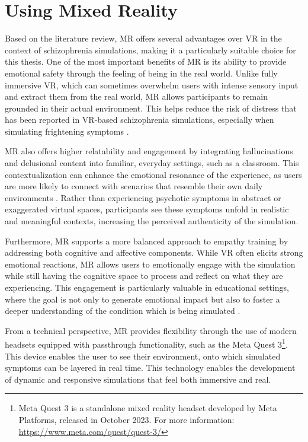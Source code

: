 \section{Using Mixed Reality}

Based on the literature review, MR offers several advantages over VR in the context of schizophrenia simulations, making it a particularly suitable choice for this thesis. One of the most important benefits of MR is its ability to provide emotional safety through the feeling of being in the real world. Unlike fully immersive VR, which can sometimes overwhelm users with intense sensory input and extract them from the real world, MR allows participants to remain grounded in their actual environment. This helps reduce the risk of distress that has been reported in VR-based schizophrenia simulations, especially when simulating frightening symptoms \cite{Zare-Bidaki2022}.

MR also offers higher relatability and engagement by integrating hallucinations and delusional content into familiar, everyday settings, such as a classroom. This contextualization can enhance the emotional resonance of the experience, as users are more likely to connect with scenarios that resemble their own daily environments \cite{Krogmeier2024}. Rather than experiencing psychotic symptoms in abstract or exaggerated virtual spaces, participants see these symptoms unfold in realistic and meaningful contexts, increasing the perceived authenticity of the simulation.

\vspace{1em}

Furthermore, MR supports a more balanced approach to empathy training by addressing both cognitive and affective components. While VR often elicits strong emotional reactions, MR allows users to emotionally engage with the simulation while still having the cognitive space to process and reflect on what they are experiencing. This engagement is particularly valuable in educational settings, where the goal is not only to generate emotional impact but also to foster a deeper understanding of the condition which is being simulated \cite{Martingano2021, Rueda2020}.

\vspace{1em}

From a technical perspective, MR provides flexibility through the use of modern headsets equipped with passthrough functionality, such as the Meta Quest 3\footnote{Meta Quest 3 is a standalone mixed reality headset developed by Meta Platforms, released in October 2023. For more information: \url{https://www.meta.com/quest/quest-3/}}. This device enables the user to see their environment, onto which simulated symptoms can be layered in real time. This technology enables the development of dynamic and responsive simulations that feel both immersive and real.

